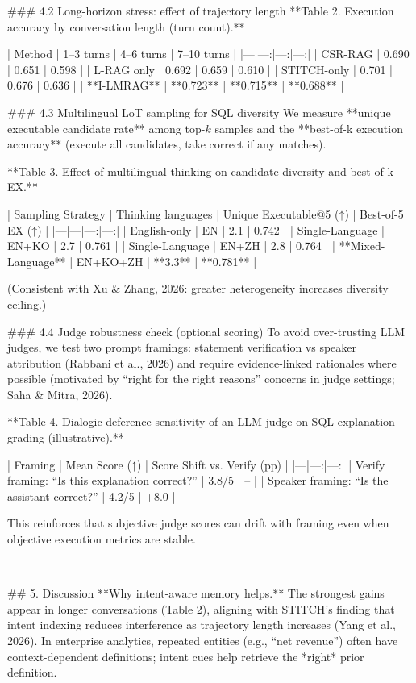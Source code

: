 ### 4.2 Long-horizon stress: effect of trajectory length  
**Table 2. Execution accuracy by conversation length (turn count).**  

| Method | 1–3 turns | 4–6 turns | 7–10 turns |
|---|---:|---:|---:|
| CSR-RAG | 0.690 | 0.651 | 0.598 |
| L-RAG only | 0.692 | 0.659 | 0.610 |
| STITCH-only | 0.701 | 0.676 | 0.636 |
| **I-LMRAG** | **0.723** | **0.715** | **0.688** |

### 4.3 Multilingual LoT sampling for SQL diversity  
We measure **unique executable candidate rate** among top-\(k\) samples and the **best-of-k execution accuracy** (execute all candidates, take correct if any matches).

**Table 3. Effect of multilingual thinking on candidate diversity and best-of-k EX.**  

| Sampling Strategy | Thinking languages | Unique Executable@5 (↑) | Best-of-5 EX (↑) |
|---|---|---:|---:|
| English-only | EN | 2.1 | 0.742 |
| Single-Language | EN+KO | 2.7 | 0.761 |
| Single-Language | EN+ZH | 2.8 | 0.764 |
| **Mixed-Language** | EN+KO+ZH | **3.3** | **0.781** |

(Consistent with Xu & Zhang, 2026: greater heterogeneity increases diversity ceiling.)

### 4.4 Judge robustness check (optional scoring)  
To avoid over-trusting LLM judges, we test two prompt framings: statement verification vs speaker attribution (Rabbani et al., 2026) and require evidence-linked rationales where possible (motivated by “right for the right reasons” concerns in judge settings; Saha & Mitra, 2026).

**Table 4. Dialogic deference sensitivity of an LLM judge on SQL explanation grading (illustrative).**  

| Framing | Mean Score (↑) | Score Shift vs. Verify (pp) |
|---|---:|---:|
| Verify framing: “Is this explanation correct?” | 3.8/5 | – |
| Speaker framing: “Is the assistant correct?” | 4.2/5 | +8.0 |

This reinforces that subjective judge scores can drift with framing even when objective execution metrics are stable.

---

## 5. Discussion  
**Why intent-aware memory helps.** The strongest gains appear in longer conversations (Table 2), aligning with STITCH’s finding that intent indexing reduces interference as trajectory length increases (Yang et al., 2026). In enterprise analytics, repeated entities (e.g., “net revenue”) often have context-dependent definitions; intent cues help retrieve the *right* prior definition.

